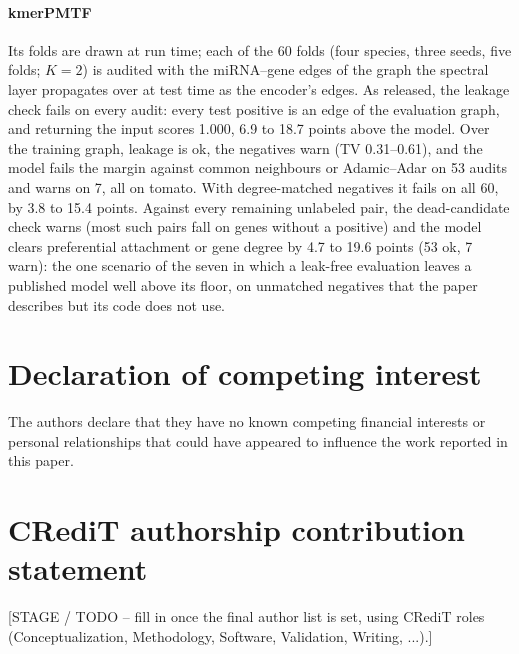 \documentclass[review]{elsarticle}
\begin{document}
\paragraph{kmerPMTF} Its folds are drawn at run time; each of the 60 folds (four species, three seeds, five folds;
$K=2$) is audited with the miRNA--gene edges of the graph the spectral layer propagates over at test time as the
encoder's edges. As released, the leakage check fails on every audit: every test positive is an edge of the
evaluation graph, and returning the input scores 1.000, 6.9 to 18.7 points above the model. Over the training
graph, leakage is ok, the negatives warn (TV 0.31--0.61), and the model fails the margin against common
neighbours or Adamic--Adar on 53 audits and warns on 7, all on tomato. With degree-matched negatives it fails on all
60, by 3.8 to 15.4 points. Against every remaining unlabeled pair, the dead-candidate check warns (most such
pairs fall on genes without a positive) and the model clears preferential attachment or gene degree by 4.7 to
19.6 points (53 ok, 7 warn): the one scenario of the seven in which a leak-free evaluation leaves a published
model well above its floor, on unmatched negatives that the paper describes but its code does not use.



\section*{Declaration of competing interest}
The authors declare that they have no known competing financial interests or personal
relationships that could have appeared to influence the work reported in this paper.

\section*{CRediT authorship contribution statement}
[STAGE / TODO -- fill in once the final author list is set, using CRediT roles
(Conceptualization, Methodology, Software, Validation, Writing, ...).]
\end{document}

